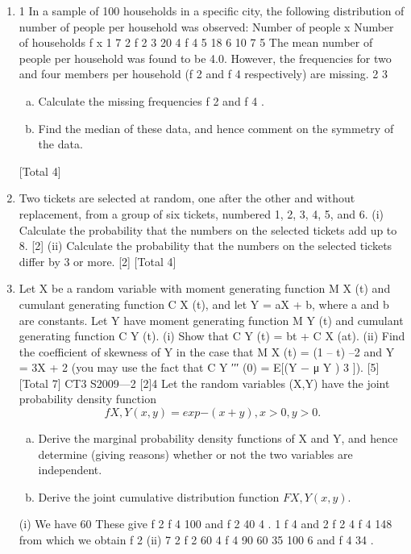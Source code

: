\documentclass[a4paper,12pt]{article}
\begin{document}
\begin{enumerate}
\item 1
In a sample of 100 households in a specific city, the following distribution of number
of people per household was observed:
Number of people x
Number of households f x
1
7
2
f 2
3
20
4
f 4
5
18
6
10
7
5
The mean number of people per household was found to be 4.0. However, the
frequencies for two and four members per household (f 2 and f 4 respectively) are
missing.
2
3

\begin{enumerate}[(a)]
\item Calculate the missing frequencies f 2 and f 4 .
\item Find the median of these data, and hence comment on the symmetry of the
data.
\end{enumerate}
[Total 4]
\item Two tickets are selected at random, one after the other and without replacement, from
a group of six tickets, numbered 1, 2, 3, 4, 5, and 6.
(i) Calculate the probability that the numbers on the selected tickets add up to 8.
[2]
(ii) Calculate the probability that the numbers on the selected tickets differ by
3 or more.
[2]
[Total 4]
\item Let X be a random variable with moment generating function M X (t) and cumulant
generating function C X (t), and let Y = aX + b, where a and b are constants. Let Y have
moment generating function M Y (t) and cumulant generating function C Y (t).
(i) Show that C Y (t) = bt + C X (at).
(ii) Find the coefficient of skewness of Y in the case that M X (t) = (1 – t) –2 and
Y = 3X + 2 (you may use the fact that C Y ′′′ (0) = E[(Y − μ Y ) 3 ]).
[5]
[Total 7]
CT3 S2009—2
[2]4
Let the random variables (X,Y) have the joint probability density function
\[f X , Y ( x , y ) = exp{ − ( x + y )}, x > 0, y > 0.\]
\begin{enumerate}[(a)]
\item Derive the marginal probability density functions of X and Y, and hence
determine (giving reasons) whether or not the two variables are independent.
\item Derive the joint cumulative distribution function $F X , Y ( x , y )$.
\end{enumerate}
(i)
We have 60
These give f 2
f 4 100 and
f 2
40
4 .
1
f 4 and 2 f 2 4 f 4 148
from which we obtain f 2
(ii)
7 2 f 2 60 4 f 4 90 60 35
100
6 and f 4
34 .

\end{enumerate}
\end{document}
